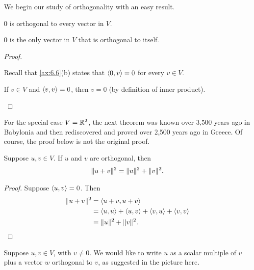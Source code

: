 We begin our study of orthogonality with an easy result.

\begin{result}\label{ax:6.11}\leavevmode
\begin{parts}
\item $0$ is orthogonal to every vector in $V$.
\item $0$ is the only vector in $V$ that is orthogonal to itself.
\end{parts}
\end{result}

\begin{proof}\leavevmode
\begin{parts}
\item Recall that \ref{ax:6.6}(b) states that $\langle 0, v \rangle=0$ for every $v\in V$.
\item If $v\in V$ and $\langle v, v \rangle=0$, then $v=0$ (by definition of inner
  product). \qedhere
\end{parts}
\end{proof}

For the special case $V=\mathbb{R}^2$, the next theorem was known over 3,500 years ago
in Babylonia and then rediscovered and proved over 2,500 years ago in Greece.
Of course, the proof below is not the original proof.

\begin{result}\label{ax:6.12}
Suppose $u,v\in V$. If $u$ and $v$ are orthogonal, then
\[ \lVert u+v \rVert^2 = \lVert u \rVert^2+\lVert v \rVert^2. \]
\end{result}

\begin{proof}
Suppose $\langle u, v \rangle=0$. Then
\begin{align*}
\lVert u+v \rVert^2 &= \langle u+v, u+v \rangle\\
  &= \langle u, u \rangle+\langle u, v \rangle+\langle v, u \rangle+\langle v, v \rangle\\
  &= \lVert u \rVert^2+\lVert v \rVert^2. \qedhere
\end{align*}
\end{proof}

Suppose $u,v\in V$, with $v\ne0$. We would like to write $u$ as a scalar
multiple of $v$ plus a vector $w$ orthogonal to $v$, as suggested in the
picture here.
\begin{center}
\end{center}

